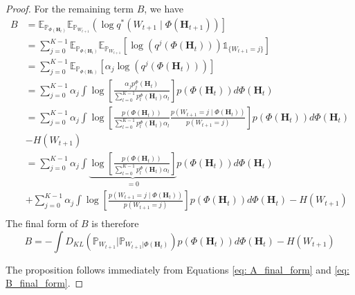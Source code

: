 \documentclass{article}
\theoremstyle{plain}
\theoremstyle{definition}
\theoremstyle{remark}
\begin{document}
\begin{proof}
    For the remaining term $B$, we have
     \begin{equation*}
        \begin{aligned}
        B &= \mathbb{E}_{\mathbb{P}_{\Phi(\mathbf{H}_t)}}\mathbb{E}_{\mathbb{P}_{W_{t+1}}}\left( \log q^{*}(W_{t+1} \mid \Phi(\mathbf{H}_{t+1})) \right] \\ 
        &= \sum_{j=0}^{K-1} \mathbb{E}_{\mathbb{P}_{\Phi(\mathbf{H}_t)}} \mathbb{E}_{\mathbb{P}_{W_{t+1}}} \left[ \log(q^{j}(\Phi(\mathbf{H}_t)))\mathds{1}_{\{W_{t+1}=j\}} \right] \\ 
        &= \sum_{j=0}^{K-1} \mathbb{E}_{\mathbb{P}_{\Phi(\mathbf{H}_t)}}\left[ \alpha_j \log(q^{j}(\Phi(\mathbf{H}_t)))\right] \\ 
        &= \sum_{j=0}^{K-1}\alpha_j \int \log\left[ \frac{\alpha_j p_{j}^{\Phi}(\mathbf{H}_t)}{\sum_{l=0}^{K-1}p_{l}^{\Phi}(\mathbf{H}_t)\alpha_l}\right]p(\Phi(\mathbf{H}_t))d\Phi(\mathbf{H}_t) \\ 
       &= \sum_{j=0}^{K-1}\alpha_j \int \log\left[ \frac{p(\Phi(\mathbf{H}_t))}{\sum_{l=0}^{K-1}p_{l}^{\Phi}(\mathbf{H}_t)\alpha_l} \frac{p(W_{t+1} =j \mid \Phi(\mathbf{H}_t))}{p(W_{t+1} =j)}\right]p(\Phi(\mathbf{H}_t))d\Phi(\mathbf{H}_t)\\ 
       &- H(W_{t+1})  \\ 
       &= \sum_{j=0}^{K-1}\alpha_j \int \underbrace{\log\left[ \frac{p(\Phi(\mathbf{H}_t))}{\sum_{l=0}^{K-1}p_{l}^{\Phi}(\mathbf{H}_t)\alpha_l}\right]}_{=0}p(\Phi(\mathbf{H}_t))d\Phi(\mathbf{H}_t) \\ 
        &+ \sum_{j=0}^{K-1}\alpha_j \int \log\left[\frac{p(W_{t+1} =j \mid \Phi(\mathbf{H}_t))}{p(W_{t+1} =j)}\right] p(\Phi(\mathbf{H}_t))d\Phi(\mathbf{H}_t) - H(W_{t+1}) \\
        \end{aligned}
    \end{equation*}
    The final form of $B$ is therefore 
    \begin{equation}
    B = - \int D_{KL}(\mathbb{P}_{W_{t+1}}| \mathbb{P}_{W_{t+1}| \Phi(\mathbf{H}_t)})p(\Phi(\mathbf{H}_t)) d\Phi(\mathbf{H}_t)
       - H(W_{t+1}) 
        \label{eq: B_final_form}
    \end{equation}

    The proposition follows immediately from Equations \eqref{eq: A_final_form} and \eqref{eq: B_final_form}.
\end{proof}
\end{document}
